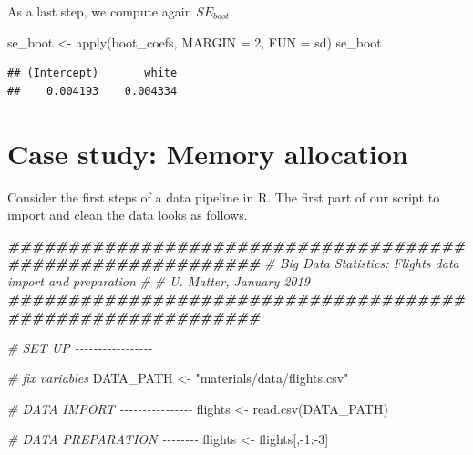 \documentclass[
  12pt,
]{style/krantz}
\newenvironment{Shaded}{\begin{snugshade}}{\end{snugshade}}
\newcommand{\AttributeTok}[1]{\textcolor[rgb]{0.77,0.63,0.00}{#1}}
\newcommand{\CommentTok}[1]{\textcolor[rgb]{0.56,0.35,0.01}{\textit{#1}}}
\newcommand{\DecValTok}[1]{\textcolor[rgb]{0.00,0.00,0.81}{#1}}
\newcommand{\DocumentationTok}[1]{\textcolor[rgb]{0.56,0.35,0.01}{\textbf{\textit{#1}}}}
\newcommand{\FunctionTok}[1]{\textcolor[rgb]{0.00,0.00,0.00}{#1}}
\newcommand{\NormalTok}[1]{#1}
\newcommand{\OtherTok}[1]{\textcolor[rgb]{0.56,0.35,0.01}{#1}}
\newcommand{\SpecialCharTok}[1]{\textcolor[rgb]{0.00,0.00,0.00}{#1}}
\newcommand{\StringTok}[1]{\textcolor[rgb]{0.31,0.60,0.02}{#1}}
\begin{document}
As a last step, we compute again \(SE_{boot}\).

\begin{Shaded}
\begin{Highlighting}[]
\NormalTok{se\_boot }\OtherTok{\textless{}{-}} \FunctionTok{apply}\NormalTok{(boot\_coefs, }
                 \AttributeTok{MARGIN =} \DecValTok{2}\NormalTok{,}
                 \AttributeTok{FUN =}\NormalTok{ sd)}
\NormalTok{se\_boot}
\end{Highlighting}
\end{Shaded}

\begin{verbatim}
## (Intercept)       white 
##    0.004193    0.004334
\end{verbatim}

\hypertarget{case-study-memory-allocation}{%
\section{Case study: Memory allocation}\label{case-study-memory-allocation}}

Consider the first steps of a data pipeline in R. The first part of our script to import and clean the data looks as follows.

\begin{Shaded}
\begin{Highlighting}[]
\DocumentationTok{\#\#\#\#\#\#\#\#\#\#\#\#\#\#\#\#\#\#\#\#\#\#\#\#\#\#\#\#\#\#\#\#\#\#\#\#\#\#\#\#\#\#\#\#\#\#\#\#\#\#\#\#\#\#\#\#\#\#\#}
\CommentTok{\# Big Data Statistics: Flights data import and preparation}
\CommentTok{\#}
\CommentTok{\# U. Matter, January 2019}
\DocumentationTok{\#\#\#\#\#\#\#\#\#\#\#\#\#\#\#\#\#\#\#\#\#\#\#\#\#\#\#\#\#\#\#\#\#\#\#\#\#\#\#\#\#\#\#\#\#\#\#\#\#\#\#\#\#\#\#\#\#\#\#}

\CommentTok{\# SET UP {-}{-}{-}{-}{-}{-}{-}{-}{-}{-}{-}{-}{-}{-}{-}{-}{-}}

\CommentTok{\# fix variables}
\NormalTok{DATA\_PATH }\OtherTok{\textless{}{-}} \StringTok{"materials/data/flights.csv"}

\CommentTok{\# DATA IMPORT {-}{-}{-}{-}{-}{-}{-}{-}{-}{-}{-}{-}{-}{-}{-}{-}}
\NormalTok{flights }\OtherTok{\textless{}{-}} \FunctionTok{read.csv}\NormalTok{(DATA\_PATH)}

\CommentTok{\# DATA PREPARATION {-}{-}{-}{-}{-}{-}{-}{-}}
\NormalTok{flights }\OtherTok{\textless{}{-}}\NormalTok{ flights[,}\SpecialCharTok{{-}}\DecValTok{1}\SpecialCharTok{:{-}}\DecValTok{3}\NormalTok{]}
\end{Highlighting}
\end{Shaded}
\end{document}
